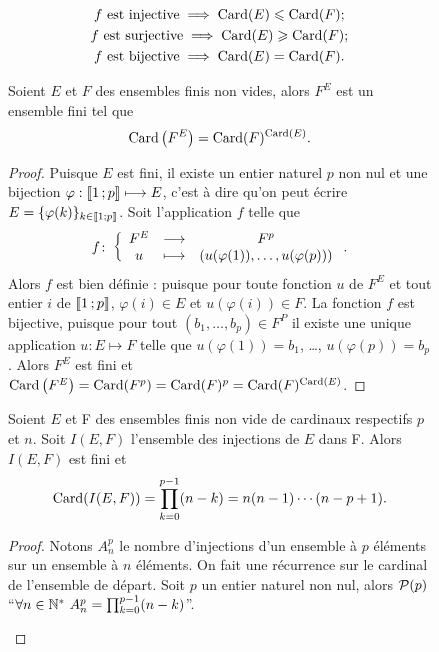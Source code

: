 \begin{figure}
\begin{itemize}
\begin{gather}
    f \text{~est injective} \implies \Card(E)\leqslant\Card(F); \\
    f \text{~est surjective}\implies \Card(E)\geqslant\Card(F);\\
    f \text{~est bijective} \implies \Card(E)=\Card(F). 
  \end{gather}
\end{itemize}
\begin{theo}
  Soient \(E\) et \(F\) des ensembles finis non vides, alors \(F^E\) est un ensemble fini tel que
  \begin{equation}
    \Card\left(F^E\right)=\Card(F)^{\Card(E)}.
  \end{equation}
\end{theo}
\begin{proof}
  Puisque \(E\) est fini, il existe un entier naturel \(p\) non nul et une bijection \(\varphi:\intervalleentier{1}{p} \longmapsto E\), c'est à dire qu'on peut écrire \(E=\{\varphi(k)\}_{k\in\intervalleentier{1}{p}}\). Soit l'application \(f\) telle que
  \begin{equation}
    \fonction{f}{F^E}{F^p}{u}{(u(\varphi(1)), \ldots, u(\varphi(p)))}.
  \end{equation}
  Alors \(f\) est bien définie : puisque pour toute fonction \(u\) de \(F^E\) et tout entier \(i\) de \(\intervalleentier{1}{p}\), \(\varphi(i) \in E\) et \(u(\varphi(i))\in F\). La fonction \(f\) est bijective, puisque pour tout \((b_1, \ldots, b_p) \in F^P\) il existe une unique application \(u:E\longmapsto F\) telle que \(u(\varphi(1))=b_1\), \ldots, \(u(\varphi(p))=b_p\). Alors \(F^E\) est fini et \(\Card\left(F^E\right)=\Card(F^p)=\Card(F)^p=\Card(F)^{\Card(E)}\).
\end{proof}
\begin{prop}\label{prop:nbinj}
  Soient \(E\) et F des ensembles finis non vide de cardinaux respectifs \(p\) et \(n\). Soit \(I(E,F)\) l'ensemble des injections de \(E\) dans F. Alors \(I(E,F)\) est fini et
  \begin{equation}
    \Card(I(E,F))=\prod_{k=0}^{p-1}(n-k)=n(n-1) \dotsm (n-p+1).
  \end{equation}
\end{prop}
\begin{proof}
  Notons \(A_n^p\) le nombre d'injections d'un ensemble à \(p\) éléments sur un ensemble à \(n\) éléments. On fait une récurrence sur le cardinal de l'ensemble de départ. Soit \(p\) un entier naturel non nul, alors \(\P(p)\) ``\(\forall n \in \N^* \ A_n^p=\prod_{k=0}^{p-1}(n-k)\)''. 
  \begin{itemize}

\end{itemize}
\end{proof}
\end{figure}
